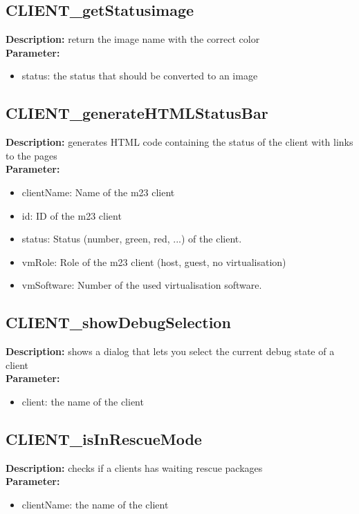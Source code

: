 \subsection{CLIENT\_getStatusimage}
\textbf{Description:} return the image name with the correct color\\
\textbf{Parameter:}
\begin{itemize}
\item status: the status that should be converted to an image
\end{itemize}

\subsection{CLIENT\_generateHTMLStatusBar}
\textbf{Description:} generates HTML code containing the status of the client with links to the pages\\
\textbf{Parameter:}
\begin{itemize}
\item clientName: Name of the m23 client
\item id: ID of the m23 client
\item status: Status (number, green, red, ...) of the client.
\item vmRole: Role of the m23 client (host, guest, no virtualisation)
\item vmSoftware: Number of the used virtualisation software.
\end{itemize}

\subsection{CLIENT\_showDebugSelection}
\textbf{Description:} shows a dialog that lets you select the current debug state of a client\\
\textbf{Parameter:}
\begin{itemize}
\item client: the name of the client
\end{itemize}

\subsection{CLIENT\_isInRescueMode}
\textbf{Description:} checks if a clients has waiting rescue packages\\
\textbf{Parameter:}
\begin{itemize}
\item clientName: the name of the client
\end{itemize}

